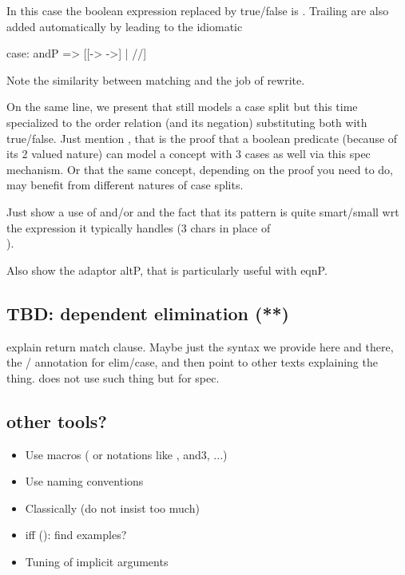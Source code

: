 In this case the boolean expression replaced by true/false is \C{(_ && _)}. 
Trailing \C{_} are also added automatically by  leading to the
idiomatic

\begin{coq}{}{}
case: andP => [[-> ->] | //]
\end{coq}

Note the similarity between matching \C{(_ && _)} and the job of rewrite.

On the same line, we present  that still models a case split but
this time specialized to the order relation (and its negation) substituting
both with true/false.  Just mention , that is the proof that
a boolean predicate (because of its 2 valued nature) can model a concept
with 3 cases as well via this spec mechanism.  Or that the same concept,
depending on the proof you need to do, may benefit from different natures
of case splits.


Just show a use of  and/or  and the fact that its pattern is
quite smart/small wrt the expression it typically handles (3 chars in place of\\
).

Also show the adaptor altP, that is particularly useful with eqnP.

\subsection{TBD: dependent elimination (**)}

explain return match clause.  Maybe just the syntax we provide here and
there, the / annotation for elim/case, and then point to other texts explaining
the thing.  \mcbMC{} does not use such thing but for spec.

\subsection{other tools?}

\begin{itemize}
\item Use macros ( or notations like
, and3, ...)
\item Use naming conventions
\item Classically (do not insist too much)
\item iff (): find examples?
\item Tuning of implicit arguments
\end{itemize}

